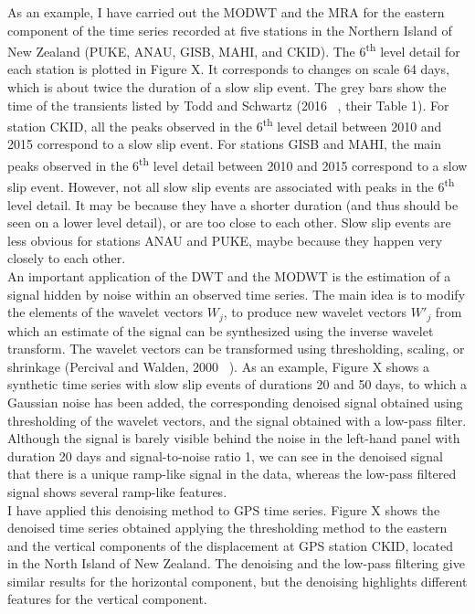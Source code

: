 \documentclass[letterpaper, 12pt]{article}
\begin{document}
As an example, I have carried out the MODWT and the MRA for the eastern component of the time series recorded at five stations in the Northern Island of New Zealand (PUKE, ANAU, GISB, MAHI, and CKID). The 6\textsuperscript{th} level detail for each station is plotted in Figure X. It corresponds to changes on scale 64 days, which is about twice the duration of a slow slip event. The grey bars show the time of the transients listed by Todd and Schwartz (2016 ~\cite{TOD_2016}, their Table 1). For station CKID, all the peaks observed in the 6\textsuperscript{th} level detail between 2010 and 2015 correspond to a slow slip event. For stations GISB and MAHI, the main peaks observed in the 6\textsuperscript{th} level detail between 2010 and 2015 correspond to a slow slip event. However, not all slow slip events are associated with peaks in the 6\textsuperscript{th} level detail. It may be because they have a shorter duration (and thus should be seen on a lower level detail), or are too close to each other. Slow slip events are less obvious for stations ANAU and PUKE, maybe because they happen very closely to each other. \\

An important application of the DWT and the MODWT is the estimation of a signal hidden by noise within an observed time series. The main idea is to modify the elements of the wavelet vectors $W_j$, to produce new wavelet vectors $W'_j$ from which an estimate of the signal can be synthesized using the inverse wavelet transform. The wavelet vectors can be transformed using thresholding, scaling, or shrinkage (Percival and Walden, 2000 ~\cite{PER_2000}). As an example, Figure X shows a synthetic time series with slow slip events of durations 20 and 50 days, to which a Gaussian noise has been added, the corresponding denoised signal obtained using thresholding of the wavelet vectors, and the signal obtained with a low-pass filter. Although the signal is barely visible behind the noise in the left-hand panel with duration 20 days and signal-to-noise ratio 1, we can see in the denoised signal that there is a unique ramp-like signal in the data, whereas the low-pass filtered signal shows several ramp-like features. \\

I have applied this denoising method to GPS time series. Figure X shows the denoised time series obtained applying the thresholding method to the eastern and the vertical components of the displacement at GPS station CKID, located in the North Island of New Zealand. The denoising and the low-pass filtering give similar results for the horizontal component, but the denoising highlights different features for the vertical component.
\end{document}
